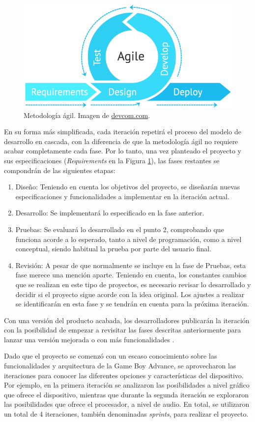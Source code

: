 \begin{figure}[h]
	\centering
	\includegraphics[width=.4\textwidth]{capitulos/capitulo1/agile.png}
	\caption[Metodología ágil]{Metodología ágil. Imagen de \url{devcom.com}.}
	\label{fig:agile}
\end{figure}

En su forma más simplificada, cada iteración repetirá el proceso del modelo de desarrollo en cascada, con la diferencia de que la metodología ágil no requiere acabar completamente cada fase. Por lo tanto, una vez planteado el proyecto y sus especificaciones (\textit{Requirements} en la Figura \ref{fig:agile}), las fases restantes se compondrán de las siguientes etapas:

\begin{enumerate}
	\item Diseño: Teniendo en cuenta los objetivos del proyecto, se diseñarán nuevas especificaciones y funcionalidades a implementar en la iteración actual.
	\item Desarrollo: Se implementará lo especificado en la fase anterior.
	\item Pruebas: Se evaluará lo desarrollado en el punto 2, comprobando que funciona acorde a lo esperado, tanto a nivel de programación, como a nivel conceptual, siendo habitual la prueba por parte del usuario final.
	\item Revisión: A pesar de que normalmente se incluye en la fase de Pruebas, esta fase merece una mención aparte. Teniendo en cuenta, los constantes cambios que se realizan en este tipo de proyectos, es necesario revisar lo desarrollado y decidir si el proyecto sigue acorde con la idea original. Los ajustes a realizar se identificarán en esta fase y se tendrán en cuenta para la próxima iteración.
\end{enumerate}

Con una versión del producto acabada, los desarrolladores publicarán la iteración con la posibilidad de empezar a revisitar las fases descritas anteriormente para lanzar una versión mejorada o con más funcionalidades \cite{bib:agile_course}.

Dado que el proyecto se comenzó con un escaso conocimiento sobre las funcionalidades y arquitectura de la Game Boy Advance, se aprovecharon las iteraciones para conocer las diferentes opciones y características del dispositivo. Por ejemplo, en la primera iteración se analizaron las posibilidades a nivel gráfico que ofrece el dispositivo, mientras que durante la segunda iteración se exploraron las posibilidades que ofrece el procesador, a nivel de audio. En total, se utilizaron un total de 4 iteraciones, también denominadas \textit{sprints}, para realizar el proyecto.

